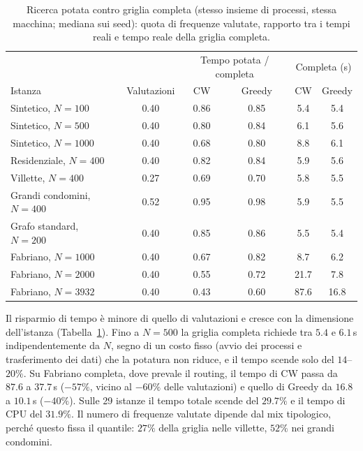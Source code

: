 \newpage
\begin{table}[htbp]
	\centering
	\caption{Ricerca potata contro griglia completa (stesso insieme di processi, stessa macchina; mediana sui seed): quota di frequenze valutate, rapporto tra i tempi reali e tempo reale della griglia completa.}
	\label{tab:t2_tempi}
	\small
	\begin{tabular}{lccccc}
		\hline
		& & \multicolumn{2}{c}{Tempo potata / completa} & \multicolumn{2}{c}{Completa (s)} \\
		Istanza & Valutazioni & CW & Greedy & CW & Greedy \\
		\hline
		Sintetico, $N=100$         & 0.40 & 0.86 & 0.85 & 5.4  & 5.4 \\
		Sintetico, $N=500$         & 0.40 & 0.80 & 0.84 & 6.1  & 5.6 \\
		Sintetico, $N=1000$        & 0.40 & 0.68 & 0.80 & 8.8  & 6.1 \\
		Residenziale, $N=400$      & 0.40 & 0.82 & 0.84 & 5.9  & 5.6 \\
		Villette, $N=400$          & 0.27 & 0.69 & 0.70 & 5.8  & 5.5 \\
		Grandi condomini, $N=400$  & 0.52 & 0.95 & 0.98 & 5.9  & 5.5 \\
		Grafo standard, $N=200$    & 0.40 & 0.85 & 0.86 & 5.5  & 5.4 \\
		Fabriano, $N=1000$         & 0.40 & 0.67 & 0.82 & 8.7  & 6.2 \\
		Fabriano, $N=2000$         & 0.40 & 0.55 & 0.72 & 21.7 & 7.8 \\
		Fabriano, $N=3932$         & 0.40 & 0.43 & 0.60 & 87.6 & 16.8 \\
		\hline
	\end{tabular}
\end{table}

Il risparmio di tempo è minore di quello di valutazioni e cresce con la dimensione dell'istanza (Tabella~\ref{tab:t2_tempi}). Fino a $N=500$ la griglia completa richiede tra $5.4$ e $6.1$\,s indipendentemente da $N$, segno di un costo fisso (avvio dei processi e trasferimento dei dati) che la potatura non riduce, e il tempo scende solo del $14$--$20\%$. Su Fabriano completa, dove prevale il routing, il tempo di CW passa da $87.6$ a $37.7$\,s ($-57\%$, vicino al $-60\%$ delle valutazioni) e quello di Greedy da $16.8$ a $10.1$\,s ($-40\%$). Sulle 29 istanze il tempo totale scende del $29.7\%$ e il tempo di CPU del $31.9\%$. Il numero di frequenze valutate dipende dal mix tipologico, perché questo fissa il quantile: $27\%$ della griglia nelle villette, $52\%$ nei grandi condomini.

